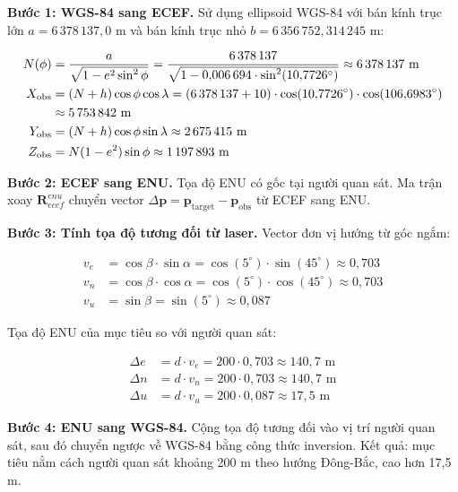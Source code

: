 \textbf{Bước 1: WGS-84 sang ECEF.} Sử dụng ellipsoid WGS-84 với bán kính trục lớn $a = 6\,378\,137{,}0$ m và bán kính trục nhỏ $b = 6\,356\,752{,}314\,245$ m:

\begin{align}
N(\phi) &= \frac{a}{\sqrt{1 - e^2 \sin^2\phi}} = \frac{6\,378\,137}{\sqrt{1 - 0{,}006\,694 \cdot \sin^2(10{,}7726^\circ)}} \approx 6\,378\,137 \text{ m} \\
X_{\text{obs}} &= (N + h) \cos\phi \cos\lambda = (6\,378\,137 + 10) \cdot \cos(10{,}7726^\circ) \cdot \cos(106{,}6983^\circ) \notag \\
&\approx 5\,753\,842 \text{ m} \\
Y_{\text{obs}} &= (N + h) \cos\phi \sin\lambda \approx 2\,675\,415 \text{ m} \\
Z_{\text{obs}} &= N(1 - e^2) \sin\phi \approx 1\,197\,893 \text{ m}
\end{align}

\textbf{Bước 2: ECEF sang ENU.} Tọa độ ENU có gốc tại người quan sát. Ma trận xoay $\mathbf{R}_{ecef}^{enu}$ chuyển vector $\Delta\mathbf{p} = \mathbf{p}_{\text{target}} - \mathbf{p}_{\text{obs}}$ từ ECEF sang ENU.

\textbf{Bước 3: Tính tọa độ tương đối từ laser.} Vector đơn vị hướng từ góc ngắm:

\begin{align}
v_e &= \cos\beta \cdot \sin\alpha = \cos(5^\circ) \cdot \sin(45^\circ) \approx 0{,}703 \\
v_n &= \cos\beta \cdot \cos\alpha = \cos(5^\circ) \cdot \cos(45^\circ) \approx 0{,}703 \\
v_u &= \sin\beta = \sin(5^\circ) \approx 0{,}087
\end{align}

Tọa độ ENU của mục tiêu so với người quan sát:

\begin{align}
\Delta e &= d \cdot v_e = 200 \cdot 0{,}703 \approx 140{,}7 \text{ m} \\
\Delta n &= d \cdot v_n = 200 \cdot 0{,}703 \approx 140{,}7 \text{ m} \\
\Delta u &= d \cdot v_u = 200 \cdot 0{,}087 \approx 17{,}5 \text{ m}
\end{align}

\textbf{Bước 4: ENU sang WGS-84.} Cộng tọa độ tương đối vào vị trí người quan sát, sau đó chuyển ngược về WGS-84 bằng công thức inversion. Kết quả: mục tiêu nằm cách người quan sát khoảng 200 m theo hướng Đông-Bắc, cao hơn 17,5 m.

